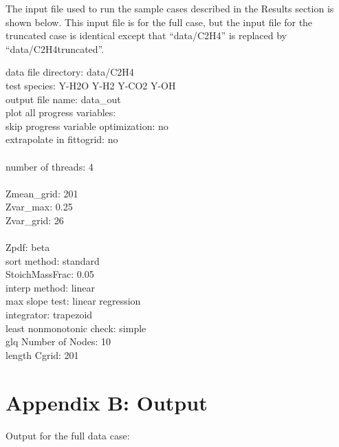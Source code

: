 \documentclass[11pt]{article}
\begin{document}
The input file used to run the sample cases described in the Results
section is shown below. This input file is for the full case, but the
input file for the truncated case is identical except that “data/C2H4”
is replaced by “data/C2H4truncated”.

\vspace{12pt}


\hfill\begin{minipage}{\dimexpr\textwidth-3cm}
data file directory:	data/C2H4 \\
test species:	Y-H2O	Y-H2	Y-CO2	Y-OH \\
output file name:	data\_out \\
plot all progress variables:	\\
skip progress variable optimization:	no \\
extrapolate in fittogrid:	no \\
\\
number of threads:	4 \\
\\
Zmean\_grid:	201 \\
Zvar\_max:	0.25 \\ 
Zvar\_grid:	26 \\
\\
Zpdf:	beta \\
sort method:	standard \\
StoichMassFrac:	0.05 \\ 
interp method:	linear \\ 
max slope test:	linear regression \\
integrator:	trapezoid \\
least nonmonotonic check:	simple \\

glq Number of Nodes:	10 \\
length Cgrid:	201 \\

\xdef\tpd{\the\prevdepth}
\end{minipage}


\clearpage
\section*{Appendix B: Output}

Output for the full data case:
\vspace{12pt}
\end{document}
